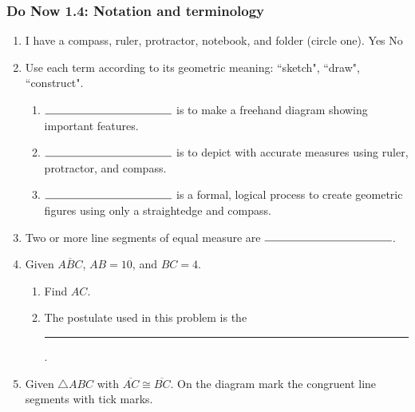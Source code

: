 \documentclass[12pt, oneside]{article}
\begin{document}
\newpage
\subsubsection*{Do Now 1.4: Notation and terminology} %
  \begin{enumerate}
    \item I have a compass, ruler, protractor, notebook, and folder (circle one). Yes \qquad No

    \item Use each term according to its geometric meaning: ``sketch", ``draw", ``construct".
    \begin{enumerate}
      \item $\rule{4cm}{0.15mm}$ is to make a freehand diagram showing important features. \smallskip
      \item $\rule{4cm}{0.15mm}$ is to depict with accurate measures using ruler, protractor, and compass. \smallskip
      \item $\rule{4cm}{0.15mm}$ is a formal, logical process to create geometric figures using only a straightedge and compass.
    \end{enumerate} \smallskip

  \item Two or more line segments of equal measure are $\rule{4cm}{0.15mm}$.
    \bigskip
  \item Given $\overline{ABC}$, $AB=10$, and $BC=4$.
  \begin{enumerate}
    \item Find ${AC}$.\\[0.75cm]
       \smallskip
    \item The postulate used in this problem is the \rule{6cm}{0.15mm}.
  \end{enumerate}
  \smallskip

  \item Given $\triangle ABC$ with $\overline{AC} \cong \overline{BC}$. On the diagram mark the congruent line segments with tick marks.
  \begin{center}
  \end{center}


\end{enumerate}
\end{document}
